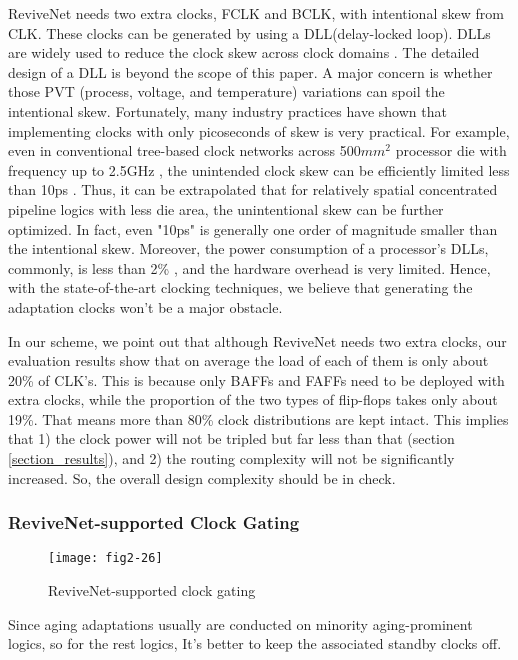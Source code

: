 ReviveNet needs two extra clocks, FCLK and BCLK, with intentional skew from CLK. These clocks can be generated by using a DLL(delay-locked loop). DLLs are widely used to reduce the clock skew across clock domains \cite{clock_01} \cite{DLL_00} \cite{DLL2_04}. The detailed design of a DLL is beyond the scope of this paper. A major concern is whether those PVT (process, voltage, and temperature) variations can spoil the intentional skew. Fortunately, many industry practices have shown that implementing clocks with only picoseconds of skew is very practical. For example, even in conventional tree-based clock networks across 500$mm^2$ processor die with frequency up to 2.5GHz , the unintended clock skew can be efficiently limited less than 10ps \cite{Itanium_clock05}. Thus, it can be extrapolated that for relatively spatial concentrated pipeline logics with less die area, the unintentional skew can be further optimized. In fact, even "10ps" is generally one order of magnitude smaller than the intentional skew. Moreover, the power consumption of a processor's DLLs, commonly, is less than 2\% \cite{clockpower_02}, and the hardware overhead is very limited. Hence, with the state-of-the-art clocking techniques, we believe that generating the adaptation clocks won't be a major obstacle.

In our scheme, we point out that although ReviveNet needs two extra clocks, our evaluation results show that on average the load of each of them is only about 20\% of CLK's. This is because only BAFFs and FAFFs need to be deployed with extra clocks, while the proportion of the two types of flip-flops takes only about 19\%. That means more than 80\% clock distributions are kept intact. This implies that 1) the clock power will not be tripled  but far less than that (section \ref{section_results}), and 2) the routing complexity will not be significantly increased. So, the overall design complexity should be in check.

\subsubsection{ReviveNet-supported Clock Gating}\label{section_clockgate}
\begin{figure}[t]
\centering
\texttt{[image: fig2-26]}%
   \caption{ReviveNet-supported clock gating}\label{clkgate}
\end{figure}

Since aging adaptations usually are conducted on minority aging-prominent logics, so for the rest logics, It's better to keep the associated standby clocks off.

